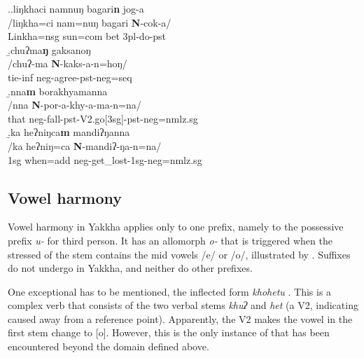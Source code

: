 \ex.\a.\glll liŋkhaci namnuŋ bagari\textbf{n} jog-a\\
/liŋkha=ci     nam=nuŋ      bagari {\bf N}-cok-a/\\
Linkha{\sc =nsg} sun{\sc =com} bet {\sc 3pl-}do{\sc -pst}		\\
 
\b.\glll  chuʔma\textbf{ŋ} gaksanoŋ\\
/chuʔ-ma  {\bf N}-kaks-a-n=hoŋ/\\
tie{\sc -inf} {\sc neg-}agree{\sc [3sg]-pst-neg=seq}\\
  
\b.\glll  nna\textbf{m} borakhyamanna\\
 /nna {\bf N}-por-a-khy-a-ma-n=na/\\
that {\sc neg-}fall{\sc -pst-V2.go[3sg]-pst-neg=nmlz.sg}\\
 
\b.\glll  ka heʔniŋca\textbf{m} mandiʔŋanna\\
/ka heʔniŋ=ca {\bf N}-mandiʔ-ŋa-n=na/\\
{\sc 1sg} when{\sc =add} {\sc neg-}get\_lost{\sc -1sg-neg=nmlz.sg}\\
					
			
			
\subsection{Vowel harmony}\label{vow-har}

Vowel harmony in Yakkha applies only to one prefix, namely to the possessive prefix  \emph{u-} for third person. It has an allomorph \emph{o-} that is triggered when the stressed  of the stem contains the mid vowels /e/ or /o/, illustrated by . Suffixes do not  undergo  in Yakkha, and neither do other prefixes. 

One  exceptional  has to be mentioned, the inflected form \emph{khohetu} . This is a complex verb that consists of the two verbal stems \emph{khuʔ}  and \emph{het} (a V2, indicating caused  away from a reference point). Apparently, the V2 makes the vowel in the first stem change to [o]. However, this is the only instance of  that has been encountered beyond the domain defined above.



